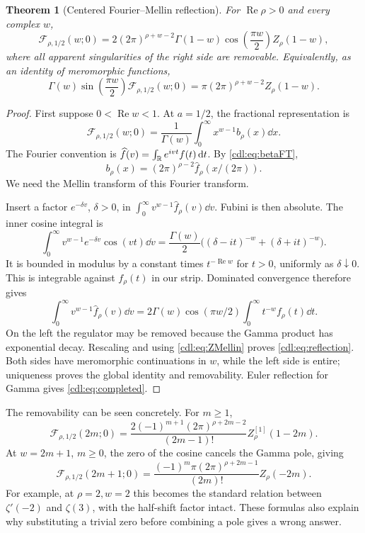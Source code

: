 \documentclass[11pt,letterpaper]{article}
\numberwithin{equation}{section}
\newtheorem{theorem}{Theorem}[section]
\theoremstyle{definition}\newtheorem{definition}[theorem]{Definition}
\theoremstyle{remark}\newtheorem{remark}[theorem]{Remark}
\newcommand{\Rea}{\operatorname{Re}}\newcommand{\Ima}{\operatorname{Im}}
\newcommand{\F}{\mathcal F}\newcommand{\E}{\mathcal E}
\begin{document}
\begin{theorem}[Centered Fourier--Mellin reflection]
\label{cdl:thm:reflection}
For $\Rea\rho>0$ and every complex $w$,
\begin{equation}\label{cdl:eq:reflection}
 \F_{\rho,1/2}(w;0)=
 2(2\pi)^{\rho+w-2}\Gamma(1-w)
 \cos\left(\frac{\pi w}2\right)Z_\rho(1-w),
\end{equation}
where all apparent singularities of the right side are removable.
Equivalently, as an identity of meromorphic functions,
\begin{equation}\label{cdl:eq:completed}
 \Gamma(w)\sin\left(\frac{\pi w}2\right)\F_{\rho,1/2}(w;0)
 =\pi(2\pi)^{\rho+w-2}Z_\rho(1-w).
\end{equation}
\end{theorem}
\begin{proof}
First suppose $0<\Rea w<1$. At $a=1/2$, the fractional representation is
\[\F_{\rho,1/2}(w;0)=\frac1{\Gamma(w)}\int_0^\infty x^{w-1}b_\rho(x)\dd x.\]
The Fourier convention is $\widehat f(v)=\int_\mathbb R e^{ivt}f(t)\,\mathrm d t$.
By \eqref{cdl:eq:betaFT},
\[b_\rho(x)=(2\pi)^{\rho-2}\widehat f_\rho(x/(2\pi)).\]
We need the Mellin transform of this Fourier transform.

Insert a factor $e^{-\delta v}$, $\delta>0$, in
$\int_0^\infty v^{w-1}\widehat f_\rho(v)\dd v$.
Fubini is then absolute. The inner cosine integral is
\[
 \int_0^\infty v^{w-1}e^{-\delta v}\cos(vt)\dd v
 =\frac{\Gamma(w)}2\bigl((\delta-it)^{-w}+(\delta+it)^{-w}\bigr).
\]
It is bounded in modulus by a constant times $t^{-\Rea w}$ for $t>0$,
uniformly as $\delta\downarrow0$. This is integrable against
$f_\rho(t)$ in our strip. Dominated convergence therefore gives
\[
 \int_0^\infty v^{w-1}\widehat f_\rho(v)\dd v
 =2\Gamma(w)\cos(\pi w/2)
   \int_0^\infty t^{-w}f_\rho(t)\dd t.
\]
On the left the regulator may be removed because the Gamma product
has exponential decay. Rescaling and using \eqref{cdl:eq:ZMellin}
proves \eqref{cdl:eq:reflection}. Both sides have meromorphic
continuations in $w$, while the left side is entire; uniqueness proves
the global identity and removability. Euler reflection for Gamma gives
\eqref{cdl:eq:completed}.
\end{proof}

The removability can be seen concretely. For $m\ge1$,
\begin{equation}\label{cdl:eq:evenreflection}
 \F_{\rho,1/2}(2m;0)=
 \frac{2(-1)^{m+1}(2\pi)^{\rho+2m-2}}{(2m-1)!}
 Z_\rho^{[1]}(1-2m).
\end{equation}
At $w=2m+1$, $m\ge0$, the zero of the cosine cancels the Gamma pole,
giving
\begin{equation}\label{cdl:eq:oddreflection}
 \F_{\rho,1/2}(2m+1;0)=
 \frac{(-1)^m\pi(2\pi)^{\rho+2m-1}}{(2m)!}Z_\rho(-2m).
\end{equation}
For example, at $\rho=2,w=2$ this becomes the standard relation
between $\zeta'(-2)$ and $\zeta(3)$, with the half-shift factor intact.
These formulas also explain why substituting a trivial zero before
combining a pole gives a wrong answer.
\end{document}
